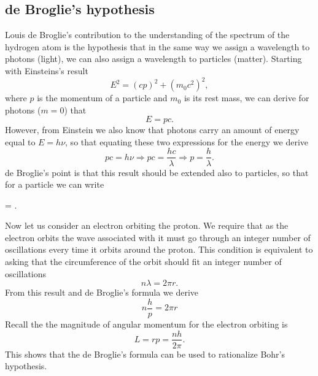 \subsection{de Broglie's hypothesis}
Louis de Broglie's
 contribution to the understanding of the spectrum of the hydrogen atom is the hypothesis that in the same way we assign a wavelength to photons (light), we can also assign a wavelength to particles (matter).
Starting with Einsteins's result
\begin{equation}
E^2 = (cp)^2 + (m_0 c^2)^2,
\end{equation}
where $p$ is the momentum of a particle and $m_0$ is its rest mass, we can derive for photons ($m = 0$) that
\begin{equation}
E = pc.
\end{equation}
However, from Einstein we also know that photons carry an amount of energy equal to $E = h \nu$, so that equating these two expressions for the energy we derive
\begin{equation}
pc = h \nu \Rightarrow pc = \frac{hc}{\lambda}  \Rightarrow p = \frac{h}{\lambda}.
\end{equation}
de Broglie's point is that this result should be extended also to particles, so that for a particle we can write
\begin{iequation}
\lambda = .
\end{iequation}

Now let us consider an electron orbiting the proton.
We require that as the electron orbits the wave associated with it must go through an integer number of oscillations every time it orbits around the proton.
This condition is equivalent to asking that the circumference of the orbit should fit an integer number of oscillations
\begin{equation}
n \lambda = 2 \pi r.
\end{equation}
From this result and de Broglie's formula we derive
\begin{equation}
n \frac{h}{p} = 2 \pi r
\end{equation}
Recall the the magnitude of angular momentum for the electron orbiting is
\begin{equation}
L = r p = \frac{n h}{2 \pi}.
\end{equation}
 This shows that the de Broglie's formula can be used to rationalize Bohr's hypothesis.


